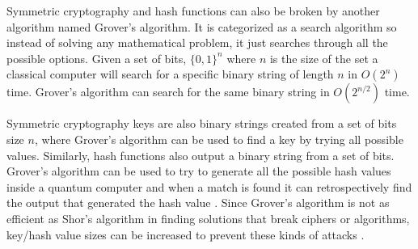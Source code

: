 Symmetric cryptography and hash functions can also be broken by another algorithm named Grover's algorithm. It is categorized as a search algorithm so instead of solving any mathematical problem, it just searches through all the possible options. Given a set of bits, $\{0, 1\}^n$ where $n$ is the size of the set a classical computer will search for a specific binary string of length $n$ in $O(2^n)$ time. Grover's algorithm can search for the same binary string in $O(2^{n/2})$ time. \cite{Yanofsky2008}

Symmetric cryptography keys are also binary strings created from a set of bits size $n$, where Grover's algorithm can be used to find a key by trying all possible values. Similarly, hash functions also output a binary string from a set of bits. Grover's algorithm can be used to try to generate all the possible hash values inside a quantum computer and when a match is found it can retrospectively find the output that generated the hash value \cite{Pretson2022}. Since Grover's algorithm is not as efficient as Shor's algorithm in finding solutions that break ciphers or algorithms, key/hash value sizes can be increased to prevent these kinds of attacks \cite{Chen2016}.

